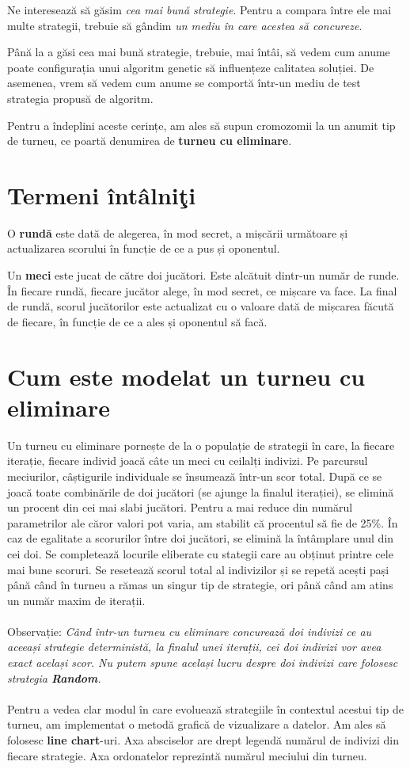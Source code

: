 Ne interesează să găsim \textit{cea mai bună strategie}. Pentru a compara între ele mai multe strategii, trebuie să gândim \textit{un mediu în care acestea să concureze}. 
 
Până la a găsi cea mai bună strategie, trebuie, mai întâi, să vedem cum anume poate configurația unui algoritm genetic să influențeze calitatea soluției. De asemenea, vrem să vedem cum anume se comportă într-un mediu de test strategia propusă de algoritm. 
 
Pentru a îndeplini aceste cerințe, am ales să supun cromozomii la un anumit tip de turneu, ce poartă denumirea de \textbf{turneu cu eliminare}.  

\section {Termeni întâlniţi}
O \textbf{rundă} este dată de alegerea, în mod secret, a mișcării următoare și actualizarea scorului în funcție de ce a pus și oponentul. 

Un \textbf{meci} este jucat de către doi jucători. Este alcătuit dintr-un număr de runde. În fiecare rundă, fiecare jucător alege, în mod secret, ce mișcare va face. La final de rundă, scorul jucătorilor este actualizat cu o valoare dată de mișcarea făcută de fiecare, în funcție de ce a ales și oponentul să facă. 

\section {Cum este modelat un turneu cu eliminare}
 
Un turneu cu eliminare pornește de la o populație de strategii în care, la fiecare iterație, fiecare individ joacă câte un meci cu ceilalți indivizi. Pe parcursul meciurilor, câștigurile individuale se însumează într-un scor total. După ce se joacă toate combinările de doi jucători (se ajunge la finalul iterației), se elimină un procent din cei mai slabi jucători.  Pentru a mai reduce din numărul parametrilor ale căror valori pot varia, am stabilit că procentul să fie de 25\%. În caz de egalitate a scorurilor între doi jucători, se elimină la întâmplare unul din cei doi. Se completează locurile eliberate cu stategii care au obținut printre cele mai bune scoruri. Se resetează scorul total al indivizilor și se repetă acești pași până când în turneu a rămas un singur tip de strategie, ori până când am atins un număr maxim de iterații.  
\\\\
Observație: \textit{Când într-un turneu cu eliminare concurează doi indivizi ce au aceeași strategie deterministă, la finalul unei iterații, cei doi indivizi vor avea exact același scor. Nu putem spune același lucru despre doi indivizi care folosesc strategia \textbf{Random}.}
\\\\
Pentru a vedea clar modul în care evoluează strategiile în contextul acestui tip de turneu, am implementat o metodă grafică de vizualizare a datelor. Am ales să folosesc \textbf{line chart}-uri. Axa absciselor are drept legendă numărul de indivizi din fiecare strategie. Axa ordonatelor reprezintă numărul meciului din turneu.

